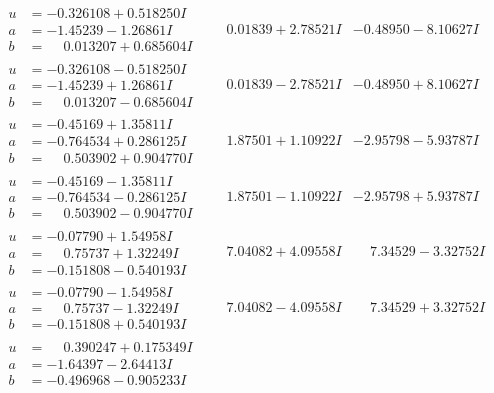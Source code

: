 \documentclass[1p]{elsarticle_modified}
\theoremstyle{definition}
\begin{document}
$$\begin{array}{c|c|c}
\begin{aligned}
u &= -0.326108 + 0.518250 I \\
a &= -1.45239 - 1.26861 I \\
b &= \phantom{-}0.013207 + 0.685604 I\end{aligned}
 & \phantom{-}0.01839 + 2.78521 I & -0.48950 - 8.10627 I \\ \hline\begin{aligned}
u &= -0.326108 - 0.518250 I \\
a &= -1.45239 + 1.26861 I \\
b &= \phantom{-}0.013207 - 0.685604 I\end{aligned}
 & \phantom{-}0.01839 - 2.78521 I & -0.48950 + 8.10627 I \\ \hline\begin{aligned}
u &= -0.45169 + 1.35811 I \\
a &= -0.764534 + 0.286125 I \\
b &= \phantom{-}0.503902 + 0.904770 I\end{aligned}
 & \phantom{-}1.87501 + 1.10922 I & -2.95798 - 5.93787 I \\ \hline\begin{aligned}
u &= -0.45169 - 1.35811 I \\
a &= -0.764534 - 0.286125 I \\
b &= \phantom{-}0.503902 - 0.904770 I\end{aligned}
 & \phantom{-}1.87501 - 1.10922 I & -2.95798 + 5.93787 I \\ \hline\begin{aligned}
u &= -0.07790 + 1.54958 I \\
a &= \phantom{-}0.75737 + 1.32249 I \\
b &= -0.151808 - 0.540193 I\end{aligned}
 & \phantom{-}7.04082 + 4.09558 I & \phantom{-}7.34529 - 3.32752 I \\ \hline\begin{aligned}
u &= -0.07790 - 1.54958 I \\
a &= \phantom{-}0.75737 - 1.32249 I \\
b &= -0.151808 + 0.540193 I\end{aligned}
 & \phantom{-}7.04082 - 4.09558 I & \phantom{-}7.34529 + 3.32752 I \\ \hline\begin{aligned}
u &= \phantom{-}0.390247 + 0.175349 I \\
a &= -1.64397 - 2.64413 I \\
b &= -0.496968 - 0.905233 I\end{aligned}

\end{array}$$
\end{document}
